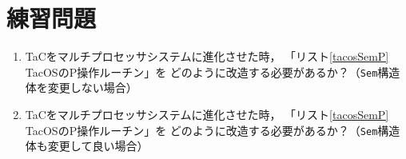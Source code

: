 \section*{練習問題}
\begin{enumerate}
  \renewcommand{\labelenumi}{\ttfamily\arabic{chapter}.\arabic{enumi}}
  \setlength{\leftskip}{1em}
\item TaCをマルチプロセッサシステムに進化させた時，
  「リスト\ref{tacosSemP} TacOSのP操作ルーチン」を
  どのように改造する必要があるか？（\texttt{Sem}構造体を変更しない場合）
\item TaCをマルチプロセッサシステムに進化させた時，
  「リスト\ref{tacosSemP} TacOSのP操作ルーチン」を
  どのように改造する必要があるか？（\texttt{Sem}構造体も変更して良い場合）
\end{enumerate}
